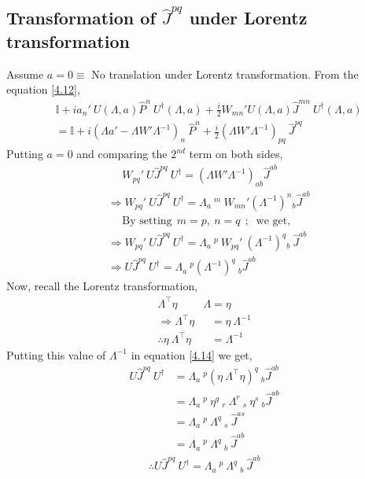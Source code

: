 \documentclass[14pt]{article} %
\begin{document}
\subsection*{Transformation of $\hat{J}^{pq}$ under Lorentz transformation}
Assume $a = 0 \equiv$ No translation under Lorentz transformation. From the equation \eqref{4.12},
\begin{align*}
&\mathbb{I} + i a_n' ~U(\Lambda, a) \hat{P}^n~ U^\dagger(\Lambda, a) + \frac{i}{2} W_{mn}' U(\Lambda, a) \hat{J}^{mn}~U^\dagger(\Lambda, a) \\
&= \mathbb{I} + i {(\Lambda a'-\Lambda W' \Lambda^{-1})}_n~\hat{P}^n + \frac{i}{2} {(\Lambda W' \Lambda^{-1})}_{pq}~\hat{J}^{pq}
\end{align*}
Putting $a=0$ and comparing the $2^{nd}$ term on both sides,
\begin{align*}
&~~~~~~ W_{pq}'~ U \hat{J}^{pq}~ U^\dagger = (\Lambda W' \Lambda^{-1})_{ab} \hat{J}^{ab} \\
&\Rightarrow W_{pq}'~ U \hat{J}^{pq}~ U^\dagger = \Lambda_a~^m~ W_{mn}'(\Lambda^{-1})^n{}_b \hat{J}^{ab} \\
&~~~~~~\text{By setting}~~ m=p,~n=q ~~;~\text{ we get,} \\
&\Rightarrow W_{pq}'~ U \hat{J}^{pq}~ U^\dagger = \Lambda_a~^p~ W_{pq}' ~(\Lambda^{-1})^q{}_b~ \hat{J}^{ab} \\
&\Rightarrow U \hat{J}^{pq}~ U^\dagger = \Lambda_a~^p (\Lambda^{-1})^q~_b \hat{J}^{ab} \tag{4.14} \label{4.14}
\end{align*}
Now, recall the Lorentz transformation,
\begin{align*}
\Lambda^\top \eta~&\Lambda = \eta \\
\Rightarrow \Lambda^\top \eta &~~~= \eta~\Lambda^{-1} \\
\therefore\eta ~\Lambda^\top \eta &~~~= \Lambda^{-1} \tag{4.15} \label{4.15}
\end{align*}
Putting this value of $\Lambda^{-1}$ in equation \eqref{4.14} we get,
\begin{align*}
U \hat{J}^{pq}~ U^\dagger &= \Lambda_a~^p (\eta ~\Lambda^\top \eta)^q~_b \hat{J}^{ab} \\
&= \Lambda_a~^p~\eta^q~_r~\Lambda^r~_s~\eta^s~_b \hat{J}^{ab}  \\
&= \Lambda_a~^p~\Lambda^q~_s~\hat{J}^{as} \\
&= \Lambda_a~^p~\Lambda^q~_b~\hat{J}^{ab}
\end{align*}
\begin{align*}
\boxed{\therefore U \hat{J}^{pq}~ U^\dagger = \Lambda_a~^p~\Lambda^q~_b~\hat{J}^{ab}}
\end{align*}
\end{document}
